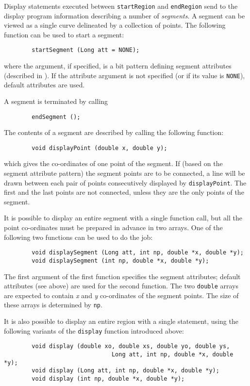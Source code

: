 Display statements executed between {\tt startRegion} and {\tt endRegion}
send to the display program information describing a number of
{\em segments}.
A segment can be viewed as a single curve delineated by a collection
of points.
The following function can be used to start a segment:
\begin{verbatim}
        startSegment (Long att = NONE);
\end{verbatim}
where the argument, if specified, is a bit pattern defining segment attributes
(described in ).
If the attribute argument is not specified (or if its value is {\tt NONE}),
default attributes are used.

A segment is terminated by calling
\begin{verbatim}
        endSegment ();
\end{verbatim}

The contents of a segment are described by calling the following function:
\begin{verbatim}
        void displayPoint (double x, double y);
\end{verbatim}
which gives the co-ordinates of one point of the segment.
If (based on the segment attribute pattern)
the segment points are to be connected, a line will be drawn between each
pair of points consecutively displayed by {\tt displayPoint}.
The first and the last points are not connected,
unless they are the only points of the segment.

It is possible to display an entire segment with a single function call, but
all the point co-ordinates must be prepared in advance in two arrays.
One of the following two functions can be used to do the job:
\begin{verbatim}
        void displaySegment (Long att, int np, double *x, double *y);
        void displaySegment (int np, double *x, double *y);
\end{verbatim}

The first argument of the first function specifies the segment attributes;
default attributes (see above) are used for the second function.
The two {\tt double} arrays are expected to contain {\em x\/} and {\em y\/} co-ordinates
of the segment points.
The size of these arrays is determined by {\tt np}.

It is also possible to display an entire region with a single statement,
using the following variants of the {\tt display} function introduced
above:

\begin{verbatim}
        void display (double xo, double xs, double yo, double ys,
                               Long att, int np, double *x, double *y);
        void display (Long att, int np, double *x, double *y);
        void display (int np, double *x, double *y);
\end{verbatim}

